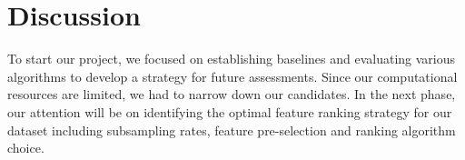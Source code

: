 \documentclass[fleqn,moreauthors,10pt]{ds_report}
\begin{document}

\section*{Discussion}

To start our project, we focused on establishing baselines and evaluating various algorithms to develop a strategy for future assessments. Since our computational resources are limited, we had to narrow down our candidates. In the next phase, our attention will be on identifying the optimal feature ranking strategy for our dataset including subsampling rates, feature pre-selection and ranking algorithm choice.






% 
% 
\end{document}
